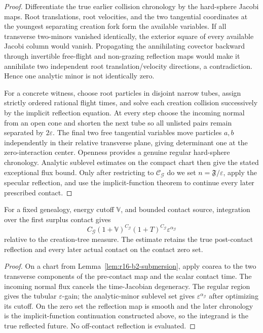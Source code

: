 \begin{proof}
Differentiate the true earlier collision chronology by the hard-sphere Jacobi
maps.  Root translations, root velocities, and the two tangential coordinates
at the youngest separating creation fork form the available variables.  If
all transverse two-minors vanished identically, the exterior square of every
available Jacobi column would vanish.  Propagating the annihilating covector
backward through invertible free-flight and non-grazing reflection maps would
make it annihilate two independent root translation/velocity directions, a
contradiction.  Hence one analytic minor is not identically zero.

For a concrete witness, choose root particles in disjoint narrow tubes, assign
strictly ordered rational flight times, and solve each creation collision
successively by the implicit reflection equation.  At every step choose the
incoming normal from an open cone and shorten the next tube so all unlisted
pairs remain separated by \(2\varepsilon\).  The final two free tangential
variables move particles \(a,b\) independently in their relative transverse
plane, giving determinant one at the zero-interaction center.  Openness
provides a genuine regular hard-sphere chronology.  Analytic sublevel
estimates on the compact chart then give the stated exceptional flux bound.
Only after restricting to \(\mathcal C_{\mathcal G}\) do we set
\(n=\mathfrak F/\varepsilon\), apply the specular reflection, and use the
implicit-function theorem to continue every later prescribed contact.
\end{proof}

\begin{lemma}
\label{lem:r16-b2-gain}
For a fixed genealogy, energy cutoff \(\mathbb V\), and bounded contact
source, integration over the first surplus contact gives
\[
 C_{\mathcal G}(1+\mathbb V)^{C_{\mathcal G}}
 (1+T)^{C_{\mathcal G}}\varepsilon^{\alpha_{\mathcal G}}
\]
relative to the creation-tree measure.  The estimate retains the true
post-contact reflection and every later actual contact on the contact zero set.
\end{lemma}

\begin{proof}
On a chart from Lemma~\ref{lem:r16-b2-submersion}, apply coarea to the two
transverse components of the pre-contact map and the scalar contact time.  The
incoming normal flux cancels the time-Jacobian degeneracy.  The regular region
gives the tubular \(\varepsilon\)-gain; the analytic-minor sublevel set gives
\(\varepsilon^{\alpha_{\mathcal G}}\) after optimizing its cutoff.  On the
zero set the reflection map is smooth and the later chronology is the
implicit-function continuation constructed above, so the integrand is the
true reflected future.  No off-contact reflection is evaluated.
\end{proof}


